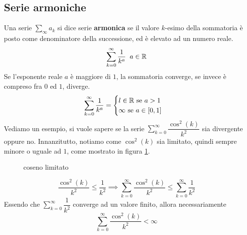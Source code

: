 \documentclass[10pt, letterpaper]{report}
\begin{document}
\subsection{Serie armoniche}
Una serie $\sum_{\infty}a_k$ si dice serie \textbf{armonica} se il valore 
$k$-esimo della sommatoria è posto come denominatore della successione, ed è 
elevato ad un numero reale.
$$\sum_{k=0}^\infty \dfrac{1}{k^a}\;\;a\in{\mathbb R}$$
Se l'esponente reale $a$ è maggiore di $1$, la sommatoria converge, se invece è 
compreso fra $0$ ed $1$, diverge.
$$ \sum_{k=0}^\infty \dfrac{1}{k^a} = \begin{cases}
    l\in {\mathbb R}\text{ se }a>1\\ 
    \infty\text{ se }a\in [0,1]\\
\end{cases}$$
Vediamo un esempio, si vuole sapere se la serie
 $\displaystyle \sum_{k=0}^\infty \dfrac{\cos^2(k)}{k^2}$
sia divergente oppure no.
Innanzitutto, notiamo come 
 $\cos^2(k)$ sia limitato, quindi sempre minore o uguale ad $1$, come mostrato in 
 figura \ref{fig:coss}.
 \begin{figure}[h!]
    \centering
    \label{fig:coss}
    \caption{coseno limitato}
\end{figure}
$$\dfrac{\cos^2(k)}{k^2}\le \dfrac{1}{k^2}
\implies 
\sum_{k=0}^\infty \dfrac{\cos^2(k)}{k^2}\le \sum_{k=0}^\infty \dfrac{1}{k^2}$$
Essendo che $\sum_{k=0}^\infty \dfrac{1}{k^2}$ converge ad un valore finito, allora
necessariamente   $$ \sum_{k=0}^\infty \dfrac{\cos^2(k)}{k^2}<\infty$$
\end{document}
